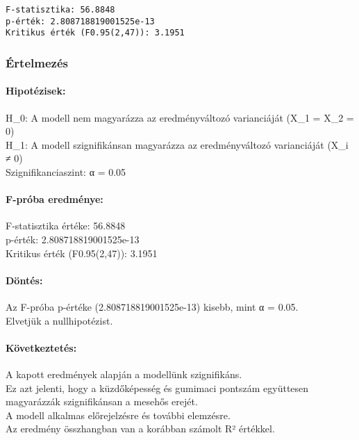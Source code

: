 \documentclass[11pt]{article}
\begin{document}
    \begin{Verbatim}[commandchars=\\\{\}]
F-statisztika: 56.8848
p-érték: 2.808718819001525e-13
Kritikus érték (F0.95(2,47)): 3.1951
    \end{Verbatim}

    \subsubsection{Értelmezés}\label{uxe9rtelmezuxe9s}

\paragraph{Hipotézisek:}\label{hipotuxe9zisek}

H\_0: A modell nem magyarázza az eredményváltozó varianciáját (X\_1 =
X\_2 = 0)\\
H\_1: A modell szignifikánsan magyarázza az eredményváltozó varianciáját
(X\_i ≠ 0)\\
Szignifikanciaszint: α = 0.05

\paragraph{F-próba eredménye:}\label{f-pruxf3ba-eredmuxe9nye}

F-statisztika értéke: 56.8848\\
p-érték: 2.808718819001525e-13\\
Kritikus érték (F0.95(2,47)): 3.1951

\paragraph{Döntés:}\label{duxf6ntuxe9s}

Az F-próba p-értéke (2.808718819001525e-13) kisebb, mint α = 0.05.\\
Elvetjük a nullhipotézist.

\paragraph{Következtetés:}\label{kuxf6vetkeztetuxe9s}

A kapott eredmények alapján a modellünk szignifikáns.\\
Ez azt jelenti, hogy a küzdőképesség és gumimaci pontszám együttesen
magyarázzák szignifikánsan a mesehős erejét.\\
A modell alkalmas előrejelzésre és további elemzésre.\\
Az eredmény összhangban van a korábban számolt R² értékkel.
\end{document}
